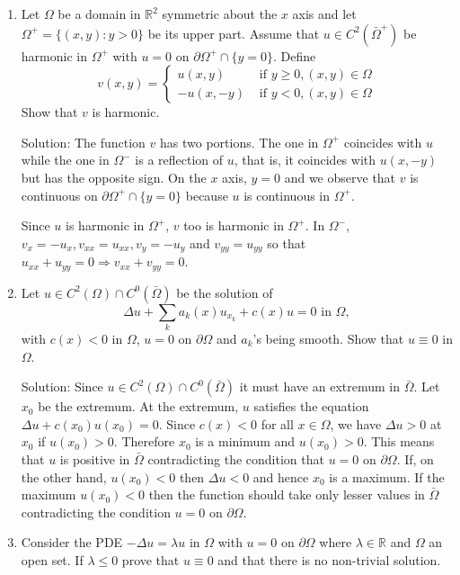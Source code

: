 \documentclass{article}
\theoremstyle{plain}
\numberwithin{thm}{section}
\theoremstyle{plain}
\numberwithin{prop}{section}
\theoremstyle{definition}
\numberwithin{defn}{section}
\theoremstyle{remark}
\numberwithin{equation}{section}
\begin{document}
\begin{enumerate}
\item Let $\Omega$ be a domain in $\mathbb{R}^2$ symmetric about the $x$ axis and let $\Omega^+ = \{(x,y):y>0\}$
be its upper part. Assume that $u \in C^2(\bar{\Omega}^+)$ be harmonic in $\Omega^+$ with $u = 0$ on 
$\partial\Omega^+ \cap \{y = 0\}$. Define 
\[
v(x,y) = \begin{cases}
u(x, y) & \text{ if } y \ge 0, (x, y) \in \Omega \\
-u(x, -y) & \text{ if } y < 0, (x, y) \in \Omega
\end{cases}
\]
Show that $v$ is harmonic.

Solution: The function $v$ has two portions. The one in $\Omega^+$ coincides with $u$ while the one in $\Omega^-$ 
is a reflection of $u$, that is, it coincides with $u(x, -y)$ but has the opposite sign. On the $x$ axis, $y = 0$ 
and we observe that $v$ is continuous on $\partial\Omega^+ \cap \{y = 0\}$ because $u$ is continuous in $\Omega^+$.

Since $u$ is harmonic in $\Omega^+$, $v$ too is harmonic in $\Omega^+$. In $\Omega^-$, $v_x = -u_x, v_{xx} = 
u_{xx}, v_y = -u_y$ and $v_{yy} = u_{yy}$ so that $u_{xx} + u_{yy} = 0 \Rightarrow v_{xx} + v_{yy} = 0$.

\item Let $u \in C^2(\Omega) \cap C^0(\bar{\Omega})$ be the solution of
\[
\Delta u + \sum_k a_k(x)u_{x_k} + c(x)u = 0 \text{ in } \Omega,
\]
with $c(x) < 0$ in $\Omega$, $u = 0$ on $\partial\Omega$ and $a_k$'s being smooth. Show that $u \equiv 0$ in 
$\Omega$.

Solution: Since $u \in C^2(\Omega) \cap C^0(\bar{\Omega})$ it must have an extremum in $\bar{\Omega}$. Let $x_0$ be
the extremum. At the extremum, $u$ satisfies the equation $\Delta u + c(x_0)u(x_0) = 0$. Since $c(x) < 0$ for all
$x \in \Omega$, we have $\Delta u > 0$ at $x_0$ if $u(x_0) > 0$. Therefore $x_0$ is a minimum and $u(x_0) > 0$.
This means that $u$ is positive in $\bar{\Omega}$ contradicting the condition that $u = 0$ on $\partial\Omega$.
If, on the other hand, $u(x_0) < 0$ then $\Delta u < 0$ and hence $x_0$ is a maximum. If the maximum $u(x_0) < 0$
then the function should take only lesser values in $\bar{\Omega}$ contradicting the condition $u=0$ on
$\partial\Omega$.

\item Consider the PDE $-\Delta u = \lambda u$ in $\Omega$ with $u = 0$ on $\partial\Omega$ where $\lambda \in
\mathbb{R}$ and $\Omega$ an open set. If $\lambda \le 0$ prove that $u \equiv 0$ and that there is no non-trivial
solution.


\end{enumerate}
\end{document}
